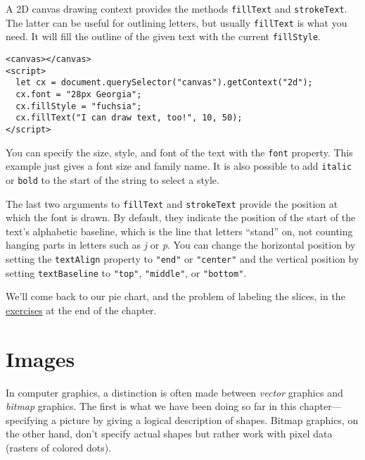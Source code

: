 A 2D canvas drawing context provides the methods \lstinline`fillText` and \lstinline`strokeText`. The latter can be useful for outlining letters, but usually \lstinline`fillText` is what you need. It will fill the outline of the given text with the current \lstinline`fillStyle`.

\begin{lstlisting}
<canvas></canvas>
<script>
  let cx = document.querySelector("canvas").getContext("2d");
  cx.font = "28px Georgia";
  cx.fillStyle = "fuchsia";
  cx.fillText("I can draw text, too!", 10, 50);
</script>
\end{lstlisting}
\noindent

You can specify the size, style, and font of the text with the \lstinline`font` property. This example just gives a font size and family name. It is also possible to add \lstinline`italic` or \lstinline`bold` to the start of the string to select a style.

The last two arguments to \lstinline`fillText` and \lstinline`strokeText` provide the position at which the font is drawn. By default, they indicate the position of the start of the text's alphabetic baseline, which is the line that letters ``stand'' on, not counting hanging parts in letters such as \emph{j} or \emph{p}. You can change the horizontal position by setting the \lstinline`textAlign` property to \lstinline`"end"` or \lstinline`"center"` and the vertical position by setting \lstinline`textBaseline` to \lstinline`"top"`, \lstinline`"middle"`, or \lstinline`"bottom"`.

We'll come back to our pie chart, and the problem of labeling the slices, in the \hyperref[canvas.exercise_pie_chart]{exercises} at the end of the chapter.

\section{Images}

In computer graphics, a distinction is often made between \emph{vector} graphics and \emph{bitmap} graphics. The first is what we have been doing so far in this chapter—specifying a picture by giving a logical description of shapes. Bitmap graphics, on the other hand, don't specify actual shapes but rather work with pixel data (rasters of colored dots).

